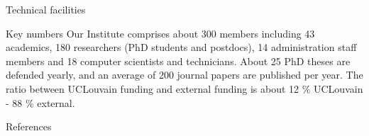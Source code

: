 \documentclass[final]{beamer}
\newlength{\onecolwid}
\begin{document}
\begin{frame}[t,fragile]
\begin{columns}[t]
\begin{column}{\onecolwid}
\begin{block}{Technical facilities}
		\begin{alertblock}{Key numbers}
			Our Institute comprises about 300 members including 43 academics, 180 researchers
			(PhD students and postdocs), 14 administration staff members and 18 computer
			scientists and technicians.
			About 25 PhD theses are defended yearly, and an average of 200 journal papers are
			published per year.
			The ratio between UCLouvain funding and external funding is about 12 \% UCLouvain -
			88 \% external.
		\end{alertblock}
  \end{block}
  \begin{block}{References}
    \printbibliography
  \end{block}
\end{column}

\end{columns} %

\end{frame}
\end{document}
